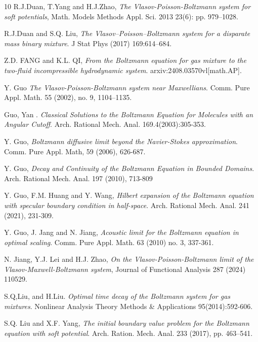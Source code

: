 \documentclass[reqno]{amsart}
\numberwithin{equation}{section}
\numberwithin{equation}{section}
\begin{document}
\begin{thebibliography}{10}
		R.J.Duan, T.Yang and H.J.Zhao, \emph{The Vlasov-Poisson-Boltzmann system for soft potentials}, Math. Models Methods Appl. Sci. 2013 23(6): pp. 979--1028.    %
		
		 R.J.Duan and S.Q. Liu, \emph{The Vlasov–Poisson–Boltzmann system for a disparate mass binary mixture}. J Stat Phys (2017) 169:614–684. %
		
		
		 Z.D. FANG and K.L. QI, \emph{From the Boltzmann equation for gas mixture to the two-fluid incompressible hydrodynamic system}. arxiv:2408.03570vl[math.AP]. %
		
		
		 Y. Guo \emph{The Vlasov-Poisson-Boltzmann system near Maxwellians}. Comm. Pure Appl. Math.
		55 (2002), no. 9, 1104–1135.  %
		
		 Guo, Yan . \emph{Classical Solutions to the Boltzmann Equation for Molecules with an Angular Cutoff}. Arch. Rational Mech. Anal. 169.4(2003):305-353. %
		
		 Y. Guo, \emph{Boltzmann diffusive limit beyond the Navier-Stokes approximation}.
		Comm. Pure Appl. Math, 59 (2006), 626-687.
		
		 Y. Guo, \emph{Decay and Continuity of the Boltzmann Equation in Bounded Domains}. Arch. Rational Mech. Anal. 197 (2010), 713-809
		
		 Y. Guo,  F.M. Huang and Y. Wang, \emph{Hilbert expansion of the Boltzmann equation with specular boundary
			condition in half-space}. Arch. Rational Mech. Anal. 241 (2021), 231-309.
		
		
		 Y. Guo, J. Jang and N. Jiang, \emph{Acoustic limit for the Boltzmann equation in optimal scaling}. Comm. Pure Appl. Math. 63 (2010) no. 3, 337-361.

		
		 N. Jiang, Y.J. Lei and H.J. Zhao, \emph{On the Vlasov-Poisson-Boltzmann limit of the Vlasov-Maxwell-Boltzmann system}, Journal of Functional Analysis 287 (2024) 110529.  %
		
		 S.Q,Liu, and H.Liu. \emph{Optimal time decay of the Boltzmann system for gas mixtures}. Nonlinear Analysis Theory Methods \& Applications 95(2014):592-606.
		
		 S.Q. Liu and X.F. Yang, \emph{The initial boundary value problem for the Boltzmann equation
		with soft potential}. Arch. Ration. Mech. Anal. 233 (2017), pp. 463--541.
		

\end{thebibliography}
\end{document}
